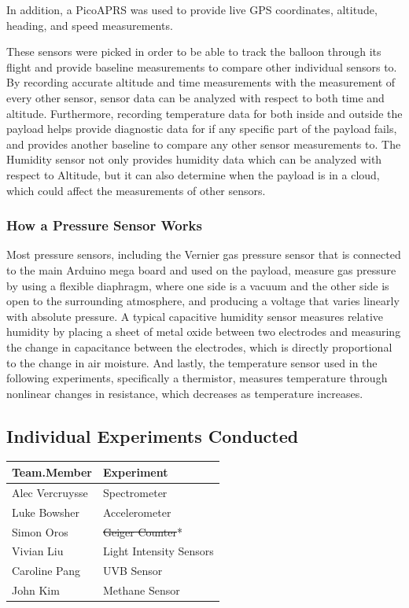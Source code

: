 \documentclass[12pt,]{article}
\begin{document}
In addition, a PicoAPRS was used to provide live GPS coordinates,
altitude, heading, and speed measurements.

These sensors were picked in order to be able to track the balloon
through its flight and provide baseline measurements to compare other
individual sensors to. By recording accurate altitude and time
measurements with the measurement of every other sensor, sensor data can
be analyzed with respect to both time and altitude. Furthermore,
recording temperature data for both inside and outside the payload helps
provide diagnostic data for if any specific part of the payload fails,
and provides another baseline to compare any other sensor measurements
to. The Humidity sensor not only provides humidity data which can be
analyzed with respect to Altitude, but it can also determine when the
payload is in a cloud, which could affect the measurements of other
sensors.

\subsubsection{How a Pressure Sensor
Works}\label{how-a-pressure-sensor-works}

Most pressure sensors, including the Vernier gas pressure sensor that is
connected to the main Arduino mega board and used on the payload,
measure gas pressure by using a flexible diaphragm, where one side is a
vacuum and the other side is open to the surrounding atmosphere, and
producing a voltage that varies linearly with absolute pressure. A
typical capacitive humidity sensor measures relative humidity by placing
a sheet of metal oxide between two electrodes and measuring the change
in capacitance between the electrodes, which is directly proportional to
the change in air moisture. And lastly, the temperature sensor used in
the following experiments, specifically a thermistor, measures
temperature through nonlinear changes in resistance, which decreases as
temperature increases.

\subsection{Individual Experiments
Conducted}\label{individual-experiments-conducted}

\begin{longtable}[]{@{}ll@{}}
\toprule
Team.Member & Experiment\tabularnewline
\midrule
\endhead
Alec Vercruysse & Spectrometer\tabularnewline
Luke Bowsher & Accelerometer\tabularnewline
Simon Oros & \sout{Geiger Counter}*\tabularnewline
Vivian Liu & Light Intensity Sensors\tabularnewline
Caroline Pang & UVB Sensor\tabularnewline
John Kim & Methane Sensor\tabularnewline
\bottomrule
\end{longtable}
\end{document}
